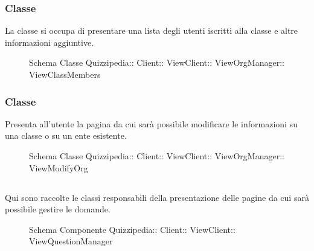 \subsubsection{Classe }
La classe si occupa di presentare una lista degli utenti iscritti alla classe e altre informazioni aggiuntive.
\begin{figure}[H]
\centering
\noindent{}
\caption[Schema Classe ViewClassMembers]{Schema Classe Quizzipedia:: Client:: ViewClient:: ViewOrgManager:: ViewClassMembers}
\end{figure}
\subsubsection{Classe }
Presenta all'utente la pagina da cui sarà possibile modificare le informazioni su una classe o su un ente esistente.
\begin{figure}[H]
\centering
\noindent{}
\caption[Schema Classe ViewModifyOrg]{Schema Classe Quizzipedia:: Client:: ViewClient:: ViewOrgManager:: ViewModifyOrg}
\end{figure}
\subsection{}
Qui sono raccolte le classi responsabili della presentazione delle pagine da cui sarà possibile gestire le domande.
\begin{figure}[H]
\centering
\noindent{}
\caption[Schema Componente Quizzipedia::Client::ViewClient::ViewQuestionManager]{Schema Componente Quizzipedia:: Client:: ViewClient:: ViewQuestionManager}
\end{figure}
